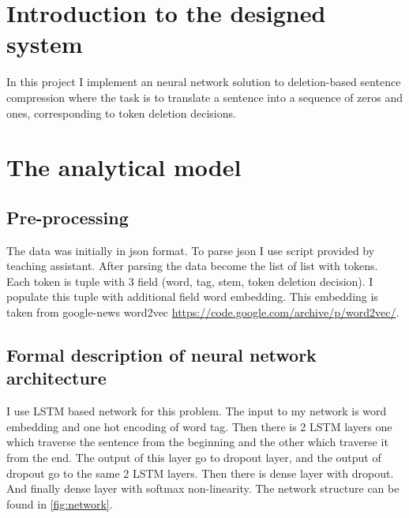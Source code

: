 \documentclass[a4paper,12pt,oneside]{article}
\begin{document}
\section {Introduction to the designed system}
In this project I implement an neural network solution to deletion-based sentence compression where the task is to translate a sentence into a sequence of zeros and ones, corresponding to token deletion decisions.

\section {The analytical model}

\subsection{Pre-processing}
The data was initially in json format. To parse json I use script provided by teaching assistant. After parsing the data become the list of list with tokens. Each token is tuple with 3 field (word, tag, stem, token deletion decision). I populate this tuple with additional field word embedding. This embedding is taken from google-news word2vec \url{https://code.google.com/archive/p/word2vec/}.

\subsection{Formal description of neural network architecture}
I use LSTM based network for this problem. The input to my network is word embedding and one hot encoding of word tag. Then there is 2 LSTM layers one which traverse the sentence from the beginning and the other which traverse it from the end. The output of this layer go to dropout layer, and the output of dropout go to the same 2 LSTM layers. Then there is dense layer with dropout. And finally dense layer with softmax non-linearity. The network structure can be found in \cref{fig:network}.
\end{document}
